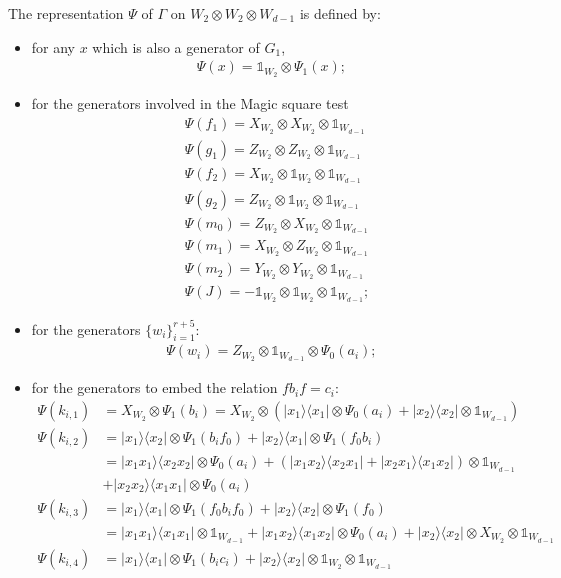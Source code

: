 \documentclass[11pt,letterpaper]{article}
\newcommand{\ketbra}[2]{|#1\rangle\langle#2|}
\newcommand{\x}{\otimes}
\newcommand{\1}{\mathbb{1}}
\theoremstyle{definition}
\begin{document}
The representation $\Psi$ of $\Gamma$ on $W_2 \x W_2 \x W_{d-1}$ is defined by:
\begin{itemize}
\item for any $x$ which is also a generator of $G_1$,
\begin{align}
	\Psi(x) = \1_{W_2} \x \Psi_1(x);
\end{align}
\item for the generators involved in the Magic square test
\begin{align}
	&\Psi(f_1) = X_{W_2} \x X_{W_2} \x \1_{W_{d-1}} \\
	&\Psi(g_1) = Z_{W_2} \x Z_{W_2} \x \1_{W_{d-1}} \\
	&\Psi(f_2) = X_{W_2} \x \1_{W_2} \x \1_{W_{d-1}} \\
	&\Psi(g_2) = Z_{W_2} \x \1_{W_2} \x \1_{W_{d-1}} \\
	& \Psi(m_0) = Z_{W_2} \x X_{W_2} \x \1_{W_{d-1}}\\
	& \Psi(m_1) = X_{W_2} \x Z_{W_2} \x \1_{W_{d-1}}\\
	& \Psi(m_2) = Y_{W_2} \x Y_{W_2} \x \1_{W_{d-1}}\\
	& \Psi(J) = - \1_{W_2} \x \1_{W_2} \x \1_{W_{d-1}};
\end{align}
\item for the generators $\{ w_i \}_{i=1}^{r+5}$:
\begin{align}
	\Psi(w_i) = Z_{W_2} \x \1_{W_{d-1}} \x \Psi_0(a_i);
\end{align}
\item for the generators to embed the relation $f b_i f = c_i$:
\begin{align}
	\Psi(k_{i,1}) &= X_{W_2} \x \Psi_1(b_i) = X_{W_2} \x ( \ketbra{x_1}{x_1} \x \Psi_0(a_i) + \ketbra{x_2}{x_2} \x \1_{W_{d-1}} )\\
	\Psi(k_{i,2}) &= \ketbra{x_1}{x_2} \x \Psi_1(b_if_0) + \ketbra{x_2}{x_1} \x \Psi_1(f_0b_i)\\
	&= \ketbra{x_1x_1}{x_2x_2} \x \Psi_0(a_i) + (\ketbra{x_1x_2}{x_2x_1}+\ketbra{x_2x_1}{x_1x_2})\x\1_{W_{d-1}}\\
	&+ \ketbra{x_2x_2}{x_1x_1} \x \Psi_0(a_i)\\ 
	\Psi(k_{i,3}) &= \ketbra{x_1}{x_1} \x \Psi_1(f_0b_if_0) + \ketbra{x_2}{x_2} \x \Psi_1(f_0) \\
	&= \ketbra{x_1x_1}{x_1x_1} \x \1_{W_{d-1}} + \ketbra{x_1x_2}{x_1x_2} \x \Psi_0(a_i) +  \ketbra{x_2}{x_2} \x X_{W_2} \x \1_{W_{d-1}}\\
	\Psi(k_{i,4}) &=  \ketbra{x_1}{x_1} \x \Psi_1(b_ic_i) + \ketbra{x_2}{x_2} \x \1_{W_2} \x \1_{W_{d-1}}\\

\end{align}
\end{itemize}
\end{document}
